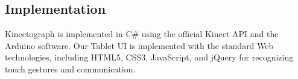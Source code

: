 \subsection{Implementation}
Kinectograph is implemented in C\# using the official Kinect API and the Arduino software. Our Tablet UI is implemented with the standard Web technologies, including HTML5, CSS3, JavaScript, and jQuery for recognizing touch gestures and communication.

